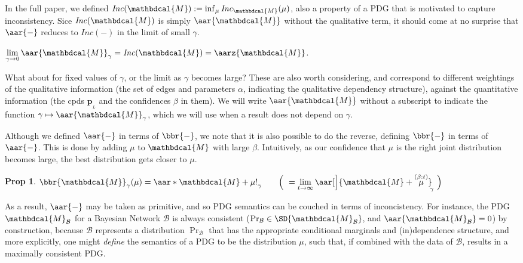 \documentclass{article}
\makeatletter
\newif\ifmarginprooflinks
\theoremstyle{plain}
\newtheorem{prop}[theorem]{Prop}
\theoremstyle{definition}
\theoremstyle{remark}
\newcommand\mat[1]{\mathbf{#1}}
\newcommand{\bp}[1][L]{\mat{p}_{\!_{#1}\!}}
\newcommand{\V}{\mathcal V}
\newcommand{\dg}[1]{\mathbdcal{#1}}
\newcommand{\bundle}{\mathbin{+}}
\newcommand\Inc{\mathit{Inc}}
\newcommand{\PDGof}[1]{{\dg M}_{#1}}
\let\oldmarginpar\marginpar
\renewcommand{\marginpar}[1]{%
		\leavevmode%
		\oldmarginpar{#1}%
		\ignorespacesafterend\ignorespaces}
\newenvironment{linked}[3][]{%
			\def\linkedproof{#3}%
			\def\linkedtype{#2}%
			\ifmarginprooflinks%
			\sbox\marginprooflinkbox{%
				\centering%
				\hyperref[proof:\linkedproof]{%
				\color{blue!30!white}%
				\scaleleftright{$\Big[$}{\,\mbox{\footnotesize\centering\tt\begin{tabular}{@{}c@{}}
					link to\\[-0.15em]
					proof
				\end{tabular}}\,}{$\Big]$}}%
				}
			\fi
			\restatable[#1]{#2}{#2:#3}\label{#2:#3}%
			\ifmarginprooflinks\marginpar{\vspace{-1ex}\usebox\marginprooflinkbox}\fi%
		}%
		{\sbox\marginprooflinkbox{}\endrestatable}
\newcommand{\begthm}[3][]{\begin{#2}[{name=#1},restate=#3,label=#3]}
\makeatother
\begin{document}
In the full paper, we defined
$\Inc(\dg M) := \inf_\mu \Inc_{\dg M}(\mu)$, also a property of
a PDG that is motivated to capture inconsistency.
Sice $\Inc(\dg M)$ is simply $\aar{\dg M}$ without the qualitative term,
it should come at no surprise that $\aar{-}$ reduces to $\Inc(-)$ in the limit
of small $\gamma$.

\begin{linked}{prop}{inc-is-inconsistency}%
	$\displaystyle \lim_{\gamma\to 0}\aar{\dg M}_\gamma = \Inc (\dg M) = \aarz{\dg M}
	$.
\end{linked}

What about for fixed values of $\gamma$, or the limit as $\gamma$ becomes large?
These are also worth considering, and correspond to different weightings of the
qualitative information (the set of edges and parameters $\alpha$, indicating the qualitative dependency structure), against the quantitative information (the
cpds $\bp{}$ and the confidences $\beta$ in them).
We will write $\aar{\dg M}$ without a subscript to indicate the function
$\gamma \mapsto \aar{\dg M}_\gamma$, which we will use when a result does not
depend on $\gamma$.

Although we defined $\aar{-}$ in terms of $\bbr{-}$,
we note that it is also possible to do the reverse,
defining $\bbr{-}$ in terms of $\aar{-}$.
This is done by adding $\mu$ to $\dg M$ with large $\beta$.
Intuitively, as our confidence that $\mu$ is the right
joint distribution becomes large, the best distribution
gets closer to $\mu$.

\begin{prop} \label{prop:sementics-via-inconsistency}
	$\displaystyle
		\bbr{\dg M}_\gamma(\mu)
			=  \aar*{\dg M \bundle \mu!}_\gamma
			\qquad\Big(~= \lim_{t \to \infty} \aar[\Big]{\dg M \bundle \overset{(\beta:t)}\mu}_{\!\!\gamma}
				~\Big)
	$
\end{prop}

As a result, $\aar{-}$  may be taken as primitive, and so PDG
semantics can be couched in terms of inconcistency. For instance, the
PDG $\PDGof{\mathcal B}$ for a Bayesian Network $\mathcal B$ is always
consistent ($\Pr_{\mathcal B} \in \SD{\PDGof{\mathcal B}}$, and $\aar{\PDGof{\mathcal B}} = 0$)
by construction, because $\mathcal B$ represents a distribution
$\Pr_{\mathcal B}$ that has the appropriate conditional marginals and
(in)dependence structure, and more explicitly, one might \emph{define}
the semantics of a PDG to be the distribution $\mu$, such that, if combined
with the data of $\mathcal B$, results in a maximally consistent PDG.
\end{document}
